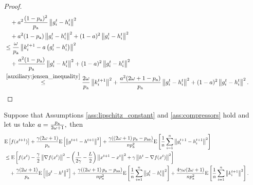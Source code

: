 \documentclass{article}
\newcommand*{\probavailable}{\ensuremath{p_{\textnormal{a}}}}
\newcommand*{\probpairaa}{\ensuremath{p_{\textnormal{aa}}}}
\begin{document}
\begin{proof}
\begin{align*}
    &\quad + a^2 \frac{(1 - \probavailable)^2}{\probavailable} \norm{g^{t}_i - h^{t}_i}^2 \\
    &\quad + a^2(1 - \probavailable)\norm{g^{t}_i - h^{t}_i}^2 + (1 - a)^2\norm{g^{t}_i - h^{t}_i}^2 \\
    &\leq \frac{\omega}{\probavailable}\norm{k^{t+1}_i - a \left(g^{t}_i - h^{t}_i\right)}^2 \\
    &\quad + \frac{a^2(1 - \probavailable)}{\probavailable} \norm{g^{t}_i - h^{t}_i}^2 + (1 - a)^2\norm{g^{t}_i - h^{t}_i}^2 \\
    &\overset{\eqref{auxiliary:jensen_inequality}}{\leq} \frac{2 \omega}{\probavailable}\norm{k^{t+1}_i}^2 + \frac{a^2(2\omega + 1 - \probavailable)}{\probavailable} \norm{g^{t}_i - h^{t}_i}^2 + (1 - a)^2\norm{g^{t}_i - h^{t}_i}^2.
  \end{align*}
\end{proof}

\begin{lemma}
  \label{lemma:main_lemma}
  Suppose that Assumptions \ref{ass:lipschitz_constant} and \ref{ass:compressors} hold and let us take $a = \frac{\probavailable}{2 \omega + 1},$ then
  \begin{align*}
    &\Exp{f(x^{t + 1})} + \frac{\gamma (2 \omega + 1)}{\probavailable} \Exp{\norm{g^{t+1} - h^{t+1}}^2} + \frac{\gamma (\left(2 \omega + 1\right)\probavailable - \probpairaa)}{n \probavailable^2} \Exp{\frac{1}{n}\sum_{i=1}^n\norm{g^{t+1}_i - h^{t+1}_i}^2}\\
    &\leq \Exp{f(x^t) - \frac{\gamma}{2}\norm{\nabla f(x^t)}^2 - \left(\frac{1}{2\gamma} - \frac{L}{2}\right)
    \norm{x^{t+1} - x^t}^2 + \gamma \norm{h^{t} - \nabla f(x^t)}^2}\nonumber\\
    &\quad + \frac{\gamma (2 \omega + 1)}{\probavailable}\Exp{\norm{g^{t} - h^t}^2}+ \frac{\gamma (\left(2 \omega + 1\right)\probavailable - \probpairaa)}{n \probavailable^2}\Exp{\frac{1}{n} \sum_{i=1}^n\norm{g^t_i - h^{t}_i}^2} + \frac{4 \gamma \omega (2 \omega + 1)}{n \probavailable^2} \Exp{\frac{1}{n} \sum_{i=1}^n\norm{k^{t+1}_i}^2}.
  \end{align*}
\end{lemma}
\end{document}
